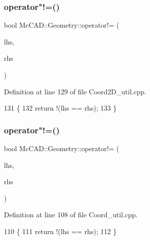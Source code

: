 \subsubsection{\texorpdfstring{operator"!=()}{operator!=()}\hspace{0.1cm}{\footnotesize\ttfamily [1/3]}}
{\footnotesize\ttfamily bool Mc\+C\+A\+D\+::\+Geometry\+::operator!= (\begin{DoxyParamCaption}\item[{const \hyperlink{classMcCAD_1_1Geometry_1_1Coord2D}{Coord2D} \&}]{lhs,  }\item[{const \hyperlink{classMcCAD_1_1Geometry_1_1Coord2D}{Coord2D} \&}]{rhs }\end{DoxyParamCaption})}



Definition at line 129 of file Coord2\+D\+\_\+util.\+cpp.


\begin{DoxyCode}
131                            \{
132     \textcolor{keywordflow}{return} !(lhs == rhs);
133 \}
\end{DoxyCode}
\mbox{\label{namespaceMcCAD_1_1Geometry_a3d4155a36e91bdfe1b6374182fe8a267}} 
\subsubsection{\texorpdfstring{operator"!=()}{operator!=()}\hspace{0.1cm}{\footnotesize\ttfamily [2/3]}}
{\footnotesize\ttfamily bool Mc\+C\+A\+D\+::\+Geometry\+::operator!= (\begin{DoxyParamCaption}\item[{const \hyperlink{classMcCAD_1_1Geometry_1_1Coord}{Coord} \&}]{lhs,  }\item[{const \hyperlink{classMcCAD_1_1Geometry_1_1Coord}{Coord} \&}]{rhs }\end{DoxyParamCaption})}



Definition at line 108 of file Coord\+\_\+util.\+cpp.


\begin{DoxyCode}
110                          \{
111     \textcolor{keywordflow}{return} !(lhs == rhs);
112 \}
\end{DoxyCode}
\mbox{\label{namespaceMcCAD_1_1Geometry_aebdcb1d5a18768d067b7b2f7271c167d}} 
